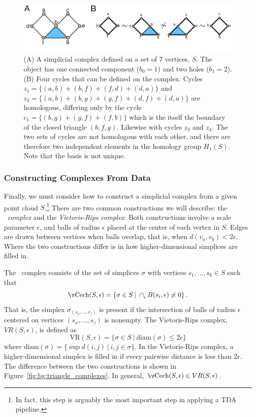 \begin{figure}
\centering
\includegraphics[]{./fig/background/homology_example.pdf}
\caption[Example]{(A) A simplicial complex defined on a set of 7 vertices, $S$. The object has one connected component ($b_0=1$) and two holes ($b_1=2$). (B) Four cycles that can be defined on the complex. Cycles $z_1=\{(a,b)+(b,f)+(f,d)+(d,a)\}$ and $z_2=\{(a,b)+(b,g)+(g,f)+(d,f)+(d,a)\}$ are homologous, differing only by the cycle $c_1=\{(b,g)+(g,f)+(f,b)\}$ which is the itself the boundary of the closed triangle $(b,f,g)$. Likewise with cycles $z_3$ and $z_4$. The two sets of cycles are not homologous with each other, and there are therefore two independent elements in the homology group $H_1(S)$. Note that the basis is not unique.}
\label{fig:bg:homology_example}
\end{figure}

\subsubsection{Constructing Complexes From Data}
\label{bg:tda:math:complexes}

Finally, we must consider how to construct a simplicial complex from a given point cloud $S$.\footnote{In fact, this step is arguably the most important step in applying a TDA pipeline.}
There are two common constructions we will describe: the \emph{\Cech\ complex} and the \emph{Vietoris-Rips complex}.
Both constructions involve a scale parameter $\epsilon$, and balls of radius $\epsilon$ placed at the center of each vertex in $S$.
Edges are drawn between vertices when balls overlap, that is, when $d(v_{a},v_{b})<2\epsilon$.
Where the two constructions differ is in how higher-dimensional simplices are filled in.

The \Cech\ complex consists of the set of simplices $\sigma$ with vertices $s_{1},\ldots,s_{k}\in S$ such that
\begin{equation}
\mathrm{\Cech}(S, \epsilon) = \left\{ \sigma\in S \:|\: \displaystyle\cap_{i}^{} B(s_{i},\epsilon)\neq0 \right\}.
\end{equation}
That is, the simplex $\sigma_{(s_{x},\ldots,s_{z})}$ is present if the intersection of balls of radius $\epsilon$ centered on vertices $(s_{x},\ldots,s_{z}	)$ is nonempty.
The Vietoris-Rips complex, $VR(S,\epsilon)$, is defined as
\begin{equation}
\mathrm{VR}(S, \epsilon) = \{ \sigma\in S\:|\:\mathrm{diam}(\sigma) \leq 2\epsilon \}
\end{equation}
where $\mathrm{diam}(\sigma)=\{ \sup d(i,j) \:|\: i,j\in\sigma \}$.
In the Vietoris-Rips complex, a higher-dimensional simplex is filled in if every pairwise distance is less than $2\epsilon$.
The difference between the two constructions is shown in Figure~\ref{fig:bg:triangle_complexes}.
In general, $\mathrm{\Cech}(S,\epsilon)\in VR(S,\epsilon)$.

